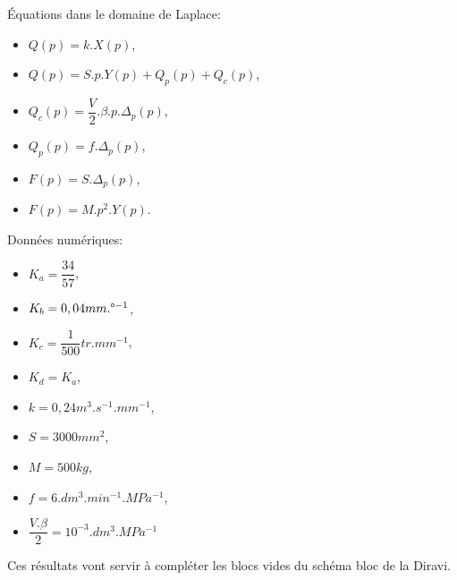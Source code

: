\begin{minipage}{0.49\linewidth}
Équations dans le domaine de Laplace:
\begin{itemize}
 \item $Q(p)=k.X(p)$,
 \item $Q(p)=S.p.Y(p)+Q_p(p)+Q_c(p)$,
 \item $Q_c(p)=\dfrac{V}{2}.\beta.p.\Delta_p(p)$,
 \item $Q_p(p)=f.\Delta_p(p)$,
 \item $F(p)=S.\Delta_p(p)$,
 \item $F(p)=M.p^2.Y(p)$.
\end{itemize}
\end{minipage}\hfill
\begin{minipage}{0.49\linewidth}
Données numériques:
\begin{itemize}
 \item $K_a=\dfrac{34}{57}$,
 \item $K_b=0,04mm.\degree^{-1}$,
 \item $K_c=\dfrac{1}{500}tr.mm^{-1}$,
 \item $K_d=K_a$,
 \item $k=0,24m^3.s^{-1}.mm^{-1}$,
 \item $S=3000mm^2$,
 \item $M=500kg$,
 \item $f=6.dm^3.min^{-1}.MPa^{-1}$,
 \item $\dfrac{V.\beta}{2}=10^{-3}.dm^3.MPa^{-1}$
\end{itemize}
\end{minipage}

Ces résultats vont servir à compléter les blocs vides du schéma bloc de la Diravi.

